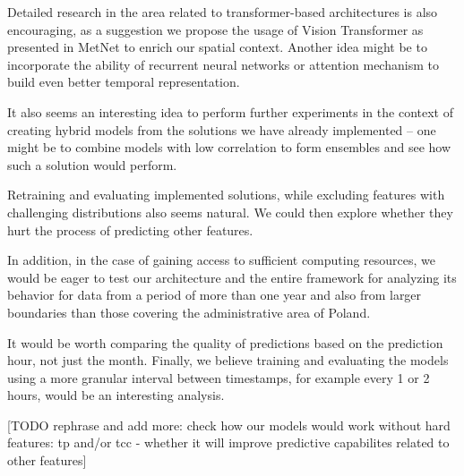 Detailed research in the area related to transformer-based architectures is also encouraging, as a suggestion we propose the usage of Vision Transformer as presented in MetNet to enrich our spatial context. Another idea might be to incorporate the ability of recurrent neural networks or attention mechanism to build even better temporal representation. 


It also seems an interesting idea to perform further experiments in the context of creating hybrid models from the solutions we have already implemented -- one might be to combine models with low correlation to form ensembles and see how such a solution would perform. 

Retraining and evaluating implemented solutions, while excluding features with challenging distributions also seems natural.  We could then explore whether they hurt the process of predicting other features.

In addition, in the case of gaining access to sufficient computing resources, we would be eager to test our architecture and the entire framework for analyzing its behavior for data from a period of more than one year and also from larger boundaries than those covering the administrative area of Poland.


It would be worth comparing the quality of predictions based on the prediction hour, not just the month. Finally, we believe training and evaluating the models using a more granular interval between timestamps, for example every 1 or 2 hours, would be an interesting analysis.


[TODO rephrase and add more: check how our models would work without hard features: tp and/or tcc - whether it will improve predictive capabilites related to other features]